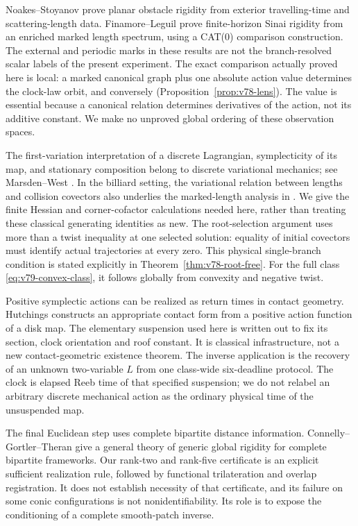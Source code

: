 Noakes--Stoyanov \cite{NoakesStoyanov2020} prove planar obstacle rigidity
from exterior travelling-time and scattering-length data.  Finamore--Leguil
\cite{FinamoreLeguil} prove finite-horizon Sinai rigidity from an enriched
marked length spectrum, using a CAT(0) comparison construction.  The
external and periodic marks in these results are not the branch-resolved
scalar labels of the present experiment.  The exact comparison actually
proved here is local: a marked canonical graph plus one absolute action
value determines the clock-law orbit, and conversely
(Proposition~\ref{prop:v78-lens}).  The value is essential because a
canonical relation determines derivatives of the action, not its
additive constant.  We make no unproved global ordering of these
observation spaces.

The first-variation interpretation of a discrete Lagrangian, symplecticity
of its map, and stationary composition belong to discrete variational
mechanics; see Marsden--West \cite{MarsdenWest2001}.  In the billiard
setting, the variational relation between lengths and collision
covectors also underlies the marked-length analysis in
\cite{BalintDeSimoiKaloshinLeguil2020}.  We give the finite Hessian and
corner-cofactor calculations needed here, rather than treating these
classical generating identities as new.  The root-selection argument
uses more than a twist inequality at one selected solution: equality of
initial covectors must identify actual trajectories at every zero.  This
physical single-branch condition is stated explicitly in
Theorem~\ref{thm:v78-root-free}.  For the full class
\eqref{eq:v79-convex-class}, it follows globally from convexity and
negative twist.

Positive symplectic actions can be realized as return times in contact
geometry.  Hutchings \cite[Proposition 2.1]{Hutchings2016} constructs an
appropriate contact form from a positive action function of a disk map.
The elementary suspension used here is written out to fix its section,
clock orientation and roof constant.  It is classical infrastructure,
not a new contact-geometric existence theorem.  The inverse application
is the recovery of an unknown two-variable $L$ from one class-wide
six-deadline protocol.  The clock is elapsed Reeb time of that specified
suspension; we do not relabel an arbitrary discrete mechanical action as
the ordinary physical time of the unsuspended map.

The final Euclidean step uses complete bipartite distance information.
Connelly--Gortler--Theran \cite{V77ConnellyGortlerTheran} give a general
theory of generic global rigidity for complete bipartite frameworks.
Our rank-two and rank-five certificate is an explicit sufficient
realization rule, followed by functional trilateration and overlap
registration.  It does not establish necessity of that certificate,
and its failure on some conic configurations is not nonidentifiability.
Its role is to expose the conditioning of a complete smooth-patch inverse.

